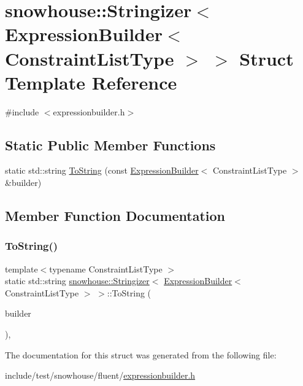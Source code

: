 \hypertarget{structsnowhouse_1_1Stringizer_3_01ExpressionBuilder_3_01ConstraintListType_01_4_01_4}{}\section{snowhouse\+::Stringizer$<$ Expression\+Builder$<$ Constraint\+List\+Type $>$ $>$ Struct Template Reference}
\label{structsnowhouse_1_1Stringizer_3_01ExpressionBuilder_3_01ConstraintListType_01_4_01_4}


{\ttfamily \#include $<$expressionbuilder.\+h$>$}

\subsection*{Static Public Member Functions}
\begin{DoxyCompactItemize}
\item 
static std\+::string \mbox{\hyperlink{structsnowhouse_1_1Stringizer_3_01ExpressionBuilder_3_01ConstraintListType_01_4_01_4_a6dd5586dbbbe9c4eb97010912161c034}{To\+String}} (const \mbox{\hyperlink{structsnowhouse_1_1ExpressionBuilder}{Expression\+Builder}}$<$ Constraint\+List\+Type $>$ \&builder)
\end{DoxyCompactItemize}


\subsection{Member Function Documentation}
\mbox{\label{structsnowhouse_1_1Stringizer_3_01ExpressionBuilder_3_01ConstraintListType_01_4_01_4_a6dd5586dbbbe9c4eb97010912161c034}} 
\subsubsection{\texorpdfstring{ToString()}{ToString()}}
{\footnotesize\ttfamily template$<$typename Constraint\+List\+Type $>$ \\
static std\+::string \mbox{\hyperlink{structsnowhouse_1_1Stringizer}{snowhouse\+::\+Stringizer}}$<$ \mbox{\hyperlink{structsnowhouse_1_1ExpressionBuilder}{Expression\+Builder}}$<$ Constraint\+List\+Type $>$ $>$\+::To\+String (\begin{DoxyParamCaption}\item[{const \mbox{\hyperlink{structsnowhouse_1_1ExpressionBuilder}{Expression\+Builder}}$<$ Constraint\+List\+Type $>$ \&}]{builder }\end{DoxyParamCaption})\hspace{0.3cm}{\ttfamily [inline]}, {\ttfamily [static]}}



The documentation for this struct was generated from the following file\+:\begin{DoxyCompactItemize}
\item 
include/test/snowhouse/fluent/\mbox{\hyperlink{expressionbuilder_8h}{expressionbuilder.\+h}}\end{DoxyCompactItemize}
